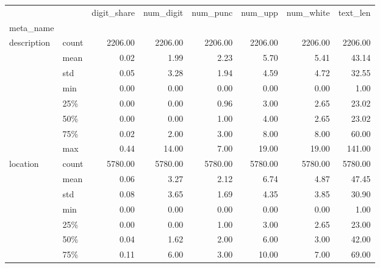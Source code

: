 \begin{table}[h]
\begin{center}

\begin{tabular}{llrrrrrr}
\toprule
            &       &  digit\_share &  num\_digit &   num\_punc &    num\_upp &  num\_white &   text\_len \\
meta\_name & {} &              &            &            &            &            &            \\
\midrule
description & count &      2206.00 &    2206.00 &    2206.00 &    2206.00 &    2206.00 &    2206.00 \\
            & mean &         0.02 &       1.99 &       2.23 &       5.70 &       5.41 &      43.14 \\
            & std &         0.05 &       3.28 &       1.94 &       4.59 &       4.72 &      32.55 \\
            & min &         0.00 &       0.00 &       0.00 &       0.00 &       0.00 &       1.00 \\
            & 25\% &         0.00 &       0.00 &       0.96 &       3.00 &       2.65 &      23.02 \\
            & 50\% &         0.00 &       0.00 &       1.00 &       4.00 &       2.65 &      23.02 \\
            & 75\% &         0.02 &       2.00 &       3.00 &       8.00 &       8.00 &      60.00 \\
            & max &         0.44 &      14.00 &       7.00 &      19.00 &      19.00 &     141.00 \\
location & count &      5780.00 &    5780.00 &    5780.00 &    5780.00 &    5780.00 &    5780.00 \\
            & mean &         0.06 &       3.27 &       2.12 &       6.74 &       4.87 &      47.45 \\
            & std &         0.08 &       3.65 &       1.69 &       4.35 &       3.85 &      30.90 \\
            & min &         0.00 &       0.00 &       0.00 &       0.00 &       0.00 &       1.00 \\
            & 25\% &         0.00 &       0.00 &       1.00 &       3.00 &       2.65 &      23.00 \\
            & 50\% &         0.04 &       1.62 &       2.00 &       6.00 &       3.00 &      42.00 \\
            & 75\% &         0.11 &       6.00 &       3.00 &      10.00 &       7.00 &      69.00 \\

\end{tabular}
\end{center}
\end{table}
